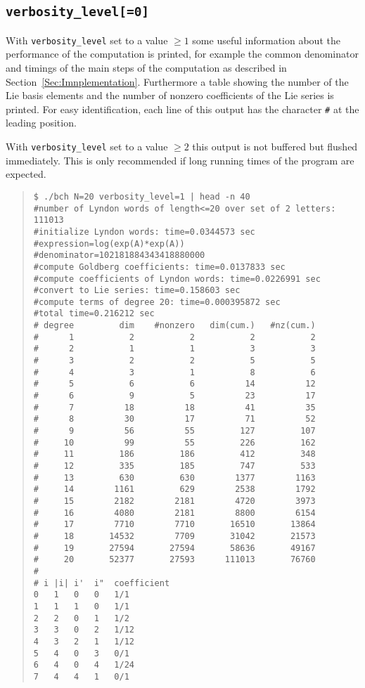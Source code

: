 \documentclass[11pt,a4paper]{article}
\begin{document}
\subsection*{\tt verbosity\_level[=0]}
With \verb|verbosity_level| set to a value $\geq 1$ some useful information about
the performance of the computation is printed, for example the common denominator 
and timings of the main steps of the computation as described in Section~\ref{Sec:Imnplementation}. Furthermore a table showing the number of the
Lie basis elements and the number of nonzero coefficients of the Lie series is printed.
For easy identification, each line of this output has the character \verb|#| at the leading position.

With \verb|verbosity_level| set to a value $\geq 2$ this  output is not buffered but flushed immediately. 
This is only recommended if long running times of the program are expected.

\begin{quote} %
{\small\begin{BVerbatim}
$ ./bch N=20 verbosity_level=1 | head -n 40
#number of Lyndon words of length<=20 over set of 2 letters: 111013
#initialize Lyndon words: time=0.0344573 sec
#expression=log(exp(A)*exp(A))
#denominator=102181884343418880000
#compute Goldberg coefficients: time=0.0137833 sec
#compute coefficients of Lyndon words: time=0.0226991 sec
#convert to Lie series: time=0.158603 sec
#compute terms of degree 20: time=0.000395872 sec
#total time=0.216212 sec
# degree         dim    #nonzero   dim(cum.)   #nz(cum.)
#      1           2           2           2           2
#      2           1           1           3           3
#      3           2           2           5           5
#      4           3           1           8           6
#      5           6           6          14          12
#      6           9           5          23          17
#      7          18          18          41          35
#      8          30          17          71          52
#      9          56          55         127         107
#     10          99          55         226         162
#     11         186         186         412         348
#     12         335         185         747         533
#     13         630         630        1377        1163
#     14        1161         629        2538        1792
#     15        2182        2181        4720        3973
#     16        4080        2181        8800        6154
#     17        7710        7710       16510       13864
#     18       14532        7709       31042       21573
#     19       27594       27594       58636       49167
#     20       52377       27593      111013       76760
#
# i	|i|	i'	i"	coefficient
0	1	0	0	1/1
1	1	1	0	1/1
2	2	0	1	1/2
3	3	0	2	1/12
4	3	2	1	1/12
5	4	0	3	0/1
6	4	0	4	1/24
7	4	4	1	0/1
\end{BVerbatim}
}\end{quote}
\end{document}
